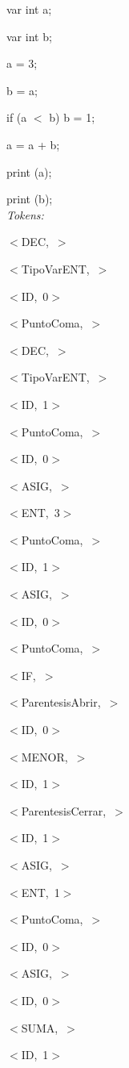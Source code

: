 \documentclass[a4paper, 12pt]{article}
\begin{document}
 
var int a;

var int b;

a = 3;

b = a;

 if (a  $<$  b) b  =  1;
 
 a = a  +  b;
 
print (a);

print (b);
\medskip\\
\emph{Tokens:}


 \mbox{$<$DEC, $>$ }
 
 
 \mbox{$<$TipoVarENT, $>$ }
 
 
 \mbox{$<$ID, 0$>$ }
 
 
 \mbox{$<$PuntoComa, $>$ }
 
 
 \mbox{$<$DEC, $>$ }
 

 \mbox{$<$TipoVarENT, $>$ }
 
 
 \mbox{$<$ID, 1$>$ }
 
 
 \mbox{$<$PuntoComa, $>$ }
 
 
 \mbox{$<$ID, 0$>$ }
 
 
 \mbox{$<$ASIG, $>$ }
 
 
 \mbox{$<$ENT, 3$>$ }
 


 \mbox{$<$PuntoComa, $>$ }
 
 
 \mbox{$<$ID, 1$>$ }
 
 
 \mbox{$<$ASIG, $>$ }
 
 
 \mbox{$<$ID, 0$>$ }
 
 
 \mbox{$<$PuntoComa, $>$ }
 
 
 \mbox{$<$IF, $>$ }
 

 \mbox{$<$ParentesisAbrir, $>$ }
 
 
 \mbox{$<$ID, 0$>$ }
 
 
 \mbox{$<$MENOR, $>$ }
 
 
 \mbox{$<$ID, 1$>$}
 
 
 \mbox{$<$ParentesisCerrar, $>$ }
 
 
 \mbox{$<$ID, 1$>$ }
 
 
 \mbox{$<$ASIG, $>$ }
 
 
 \mbox{$<$ENT, 1$>$ }
 
 
 \mbox{$<$PuntoComa, $>$ }
 
 
 \mbox{$<$ID, 0$>$ }
 
 
 \mbox{$<$ASIG, $>$ }
 
 
 \mbox{$<$ID, 0$>$ }
 
 
 \mbox{$<$SUMA, $>$ }
 
 
 \mbox{$<$ID, 1$>$ }
 
\end{document}
